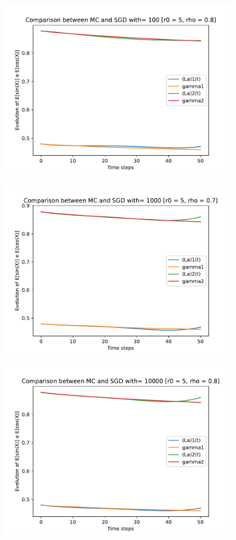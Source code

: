 \documentclass[a4paper,11pt,openright]{report}
\begin{document}
\begin{figure}[H]
\centering
\includegraphics[width=0.9\textwidth]{images/graphics T = 0.5/n = 4, M = 100 sine and cosine.pdf}
\end{figure}
\begin{figure}[H]
\centering
\includegraphics[width=0.9\textwidth]{images/graphics T = 0.5/n = 4, M = 1000 sine and cosine.pdf}
\end{figure}
\begin{figure}[H]
\centering
\includegraphics[width=0.9\textwidth]{images/graphics T = 0.5/n = 4, M = 10000 sine and cosine.pdf}
\end{figure}
\newpage
\end{document}
